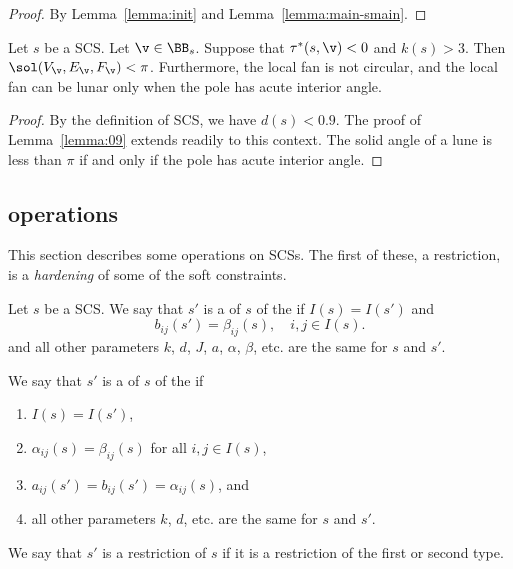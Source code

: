 \begin{proof} By Lemma~\ref{lemma:init} and Lemma~\ref{lemma:main-smain}.
\end{proof}

\begin{lemma}\label{lemma:not-circular}
Let $s$ be a SCS.  Let $\v\in \BB_s$.
Suppose that $\tau^*(s,\v)< 0$ and $k(s)>3$.  Then
$\sol(V_\v,E_\v,F_\v) < \pi$.
Furthermore, the local fan is not circular, and
the local fan can be lunar only when the pole has acute interior
angle.
\end{lemma}

\begin{proof} By the definition of SCS,
we have $d(s)< 0.9$. The proof of Lemma~\ref{lemma:09} extends readily
to this context. The solid angle of a lune is less than $\pi$ if and only
if the pole has acute interior angle.
\end{proof}








\subsection{operations}

This section describes some operations on SCSs.  
The first of these, a restriction,
 is a {\it hardening} of some of the soft constraints.


\begin{definition}[restriction]
Let $s$ be a SCS.
We say that $s'$ is a  of $s$ of the  if $I(s)=I(s')$ and
\[
b_{ij}(s') =  \beta_{ij}(s), \quad i,j\in I(s).
\]
and all other parameters $k$, $d$, $J$, $a$, $\alpha$, $\beta$, etc. are
the same for $s$ and $s'$.

We say that $s'$ is a  of $s$ of the  if 
\begin{enumerate}
\item $I(s)=I(s')$,
\item $\alpha_{ij}(s)=\beta_{ij}(s)$ for all $i,j\in I(s)$,
\item
$a_{ij}(s') = b_{ij}(s') = \alpha_{i j} (s)$,
and 
\item all other parameters $k$, $d$, etc.
are
the same for $s$ and $s'$.
\end{enumerate}
We say that $s'$ is a restriction of $s$ if it is a restriction of
the first or second type.
\end{definition}



